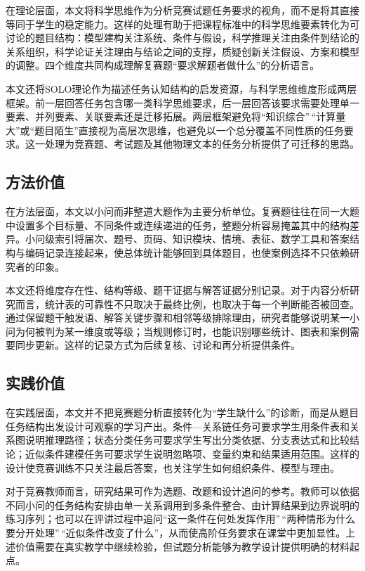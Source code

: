 \documentclass[
  12pt,
  a4paper]{ctexbook}
\begin{document}
在理论层面，本文将科学思维作为分析竞赛试题任务要求的视角，而不是将其直接等同于学生的稳定能力。这样的处理有助于把课程标准中的科学思维要素转化为可讨论的题目结构：模型建构关注系统、条件与假设，科学推理关注由条件到结论的关系组织，科学论证关注理由与结论之间的支撑，质疑创新关注假设、方案和模型的调整。四个维度共同构成理解复赛题``要求解题者做什么''的分析语言。

本文还将SOLO理论作为描述任务认知结构的启发资源，与科学思维维度形成两层框架。前一层回答任务包含哪一类科学思维要求，后一层回答该要求需要处理单一要素、并列要素、关联要素还是迁移拓展。两层框架避免将``知识综合''\,``计算量大''或``题目陌生''直接视为高层次思维，也避免以一个总分覆盖不同性质的任务要求。这一处理为竞赛题、考试题及其他物理文本的任务分析提供了可迁移的思路。

\subsection{方法价值}\label{ux65b9ux6cd5ux4ef7ux503c}

在方法层面，本文以小问而非整道大题作为主要分析单位。复赛题往往在同一大题中设置多个目标量、不同条件或连续递进的任务，整题分析容易掩盖其中的结构差异。小问级索引将届次、题号、页码、知识模块、情境、表征、数学工具和答案结构与编码记录连接起来，使总体统计能够回到具体题目，也使案例选择不只依赖研究者的印象。

本文还将维度存在性、结构等级、题干证据与解答证据分别记录。对于内容分析研究而言，统计表的可靠性不只取决于最终比例，也取决于每一个判断能否被回查。通过保留题干触发语、解答关键步骤和相邻等级排除理由，研究者能够说明某一小问为何被判为某一维度或等级；当规则修订时，也能识别哪些统计、图表和案例需要同步更新。这样的记录方式为后续复核、讨论和再分析提供条件。

\subsection{实践价值}\label{ux5b9eux8df5ux4ef7ux503c}

在实践层面，本文并不把竞赛题分析直接转化为``学生缺什么''的诊断，而是从题目任务结构出发设计可观察的学习产出。条件---关系链任务可要求学生用条件表和关系图说明推理路径；状态分类任务可要求学生写出分类依据、分支表达式和比较结论；近似条件建模任务可要求学生说明忽略项、变量约束和结果适用范围。这样的设计使竞赛训练不只关注最后答案，也关注学生如何组织条件、模型与理由。

对于竞赛教师而言，研究结果可作为选题、改题和设计追问的参考。教师可以依据不同小问的任务结构安排由单一关系调用到多条件整合、由计算结果到边界说明的练习序列；也可以在评讲过程中追问``这一条件在何处发挥作用''\,``两种情形为什么要分开处理''\,``近似条件改变了什么''，从而使高阶任务要求在课堂中更加显性。上述价值需要在真实教学中继续检验，但试题分析能够为教学设计提供明确的材料起点。
\end{document}
